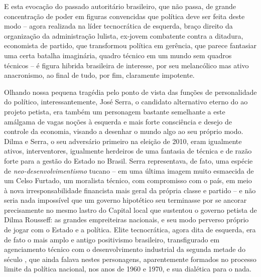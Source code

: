 E esta evocação do passado autoritário brasileiro, que não passa, de
grande concentração de poder em figuras convencidas que política deve
ser feita deste modo -- agora realizada na líder tecnocrática de
esquerda, braço direito da organização da administração lulista, ex-jovem 
combatente contra a ditadura, economista de partido, que
transformou política em gerência, que parece fantasiar uma certa batalha
imaginária, quadro técnico em um mundo sem quadros técnicos -- é figura
hibrida brasileira de interesse, por seu melancólico mas ativo
anacronismo, ao final de tudo, por fim, claramente impotente.

Olhando nossa pequena tragédia pelo ponto de vista das funções de
personalidade do político, interessantemente, José Serra, o candidato
alternativo eterno do  ao projeto petista, era também um personagem
bastante semelhante a este amálgama de vagas noções à esquerda e mais
forte consciência e desejo de controle da economia, visando a desenhar o
mundo algo ao seu próprio modo. Dilma e Serra, o seu adversário primeiro
na eleição de 2010, eram igualmente ativos, interventores, igualmente
herdeiros de uma fantasia de técnica e de razão forte para a gestão do
Estado no Brasil. Serra representava, de fato, uma espécie de
\emph{neo-desenvolvimentismo} tucano -- em uma última imagem muito
esmaecida de um Celso Furtado, um moralista técnico, com compromisso com
o país, em meio à nova irresponsabilidade financista mais geral da
própria classe e partido -- e não seria nada impossível que um governo
hipotético seu terminasse por se ancorar precisamente no mesmo lastro do
Capital local que sustentou o governo petista de Dilma Rousseff: as
grandes empreiteiras nacionais, e seu modo perverso próprio de jogar com
o Estado e a política. Elite tecnocrática, agora dita de esquerda, era
de fato o mais amplo e antigo positivismo brasileiro, transfigurado em
agenciamento técnico com o desenvolvimento industrial da segunda metade
do século , que ainda falava nestes personagens, aparentemente
formados no processo limite da política nacional, nos anos de 1960 e
1970, e sua dialética para o nada.

